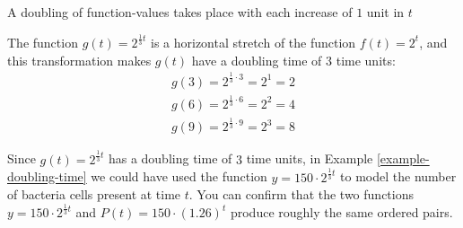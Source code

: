 \documentclass[10pt,]{book}
\theoremstyle{plain}
\theoremstyle{definition}
\theoremstyle{definition}
\theoremstyle{definition}
\numberwithin{equation}{section}
\begin{document}
\par
A doubling of function-values takes place with each increase of \(1\) unit in \(t\)%
\par
The function \(g(t)=2^{\frac{1}{3} t}\) is a horizontal stretch of the function \(f(t)=2^t\), and this transformation makes \(g(t)\) have a doubling time of \(3\) time units:%
%
\begin{gather*}
g(3)=2^{\frac{1}{3} \cdot 3}=2^1=2\\
g(6)=2^{\frac{1}{3} \cdot 6}=2^2=4\\
g(9)=2^{\frac{1}{3} \cdot 9}=2^3=8
\end{gather*}
\par
Since \(g(t)=2^{\frac{1}{3} t}\) has a doubling time of \(3\) time units, in Example \hyperref[example-doubling-time]{\ref{example-doubling-time}} we could have used the function \(y = 150 \cdot 2^{\frac{1}{3} t}\) to model the number of bacteria cells present at time \(t\). You can confirm that the two functions \(y = 150 \cdot 2^{\frac{1}{3} t}\) and \(P(t)=150 \cdot (1.26)^t\) produce roughly the same ordered pairs.%
\typeout{************************************************}
\typeout{************************************************}
\end{document}
